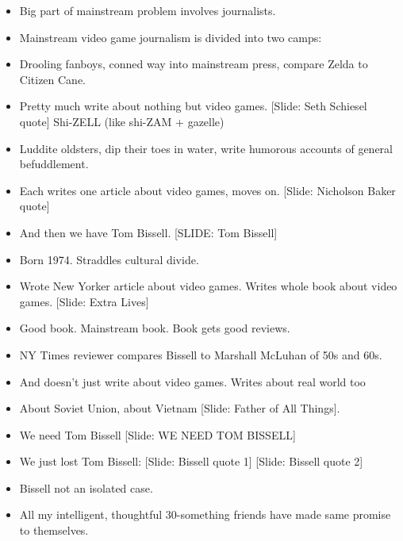\documentclass[12pt]{article}
\begin{document}
{\begin{itemize}
\item Big part of mainstream problem involves journalists.


\item Mainstream video game journalism is divided into two camps:

\item Drooling fanboys, conned way into mainstream press, compare Zelda to Citizen Cane.  

\item Pretty much write about nothing but video games. [Slide:  Seth Schiesel quote]  Shi-ZELL (like shi-ZAM + gazelle)

\item Luddite oldsters, dip their toes in water, write humorous accounts of general befuddlement.  

\item Each writes one article about video games, moves on.  [Slide:  Nicholson Baker quote]

\item And then we have Tom Bissell.  [SLIDE: Tom Bissell]

\item Born 1974.  Straddles cultural divide.  

\item Wrote New Yorker article about video games.  Writes whole book about video games.  [Slide:  Extra Lives]  

\item Good book.  Mainstream book.  Book gets good reviews.  

\item NY Times reviewer compares Bissell to Marshall McLuhan of 50s and 60s.

\item And doesn't just write about video games.  Writes about real world too

\item About Soviet Union, about Vietnam [Slide: Father of All Things].

\item We need Tom Bissell  [Slide:  WE NEED TOM BISSELL]

\item We just lost Tom Bissell:  [Slide:  Bissell quote 1] [Slide:  Bissell quote 2]



\item Bissell not an isolated case.  

\item All my intelligent, thoughtful 30-something friends have made same promise to themselves.


\end{itemize}}
\end{document}

